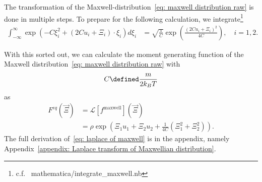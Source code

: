 The transformation of the Maxwell-distribution~\eqref{eq: maxwell distribution raw} is done in multiple steps.
To prepare for the following calculation, we integrate\footnote{c.f.~\cite{gitrepo_MastersThesis} mathematica/integrate\_maxwell.nb}
\begin{equation}
  \label{eq:integrate exponential sage}
  \begin{aligned}
    \int_{-\infty}^{\infty} \exp \left(-C \xi_i^2 + (2Cu_i + \Xi_i)\cdot\xi_i \right) d\xi_i
    & = \sqrt{\frac{\pi}{C}}\exp \left( \frac{{(2Cu_i + \Xi_i)}^2}{4C}\right),\quad i=1,2
    .
  \end{aligned}
\end{equation}

With this sorted out, we can calculate the moment generating function of the Maxwell distribution~\eqref{eq: maxwell distribution raw} with
\begin{equation}
  C \defined \frac{m}{2 k_B T}
\end{equation}
as
\begin{equation}
  \label{eq: laplace of maxwell}
  \begin{aligned}
    F^{eq}(\vec{\Xi}) & = \mathcal{L}[f^{\text{maxwell}}](\vec{\Xi})
    \\& = \rho
      \exp \left( \Xi_1 u_1 + \Xi_2 u_2 + \frac{1}{4C}\left(\Xi_1^2 + \Xi_2^2 \right)\right).
  \end{aligned}
\end{equation}
The full derivation of~\eqref{eq: laplace of maxwell} is in the appendix, namely Appendix~\ref{appendix: Laplace transform of Maxwellian distribution}.
